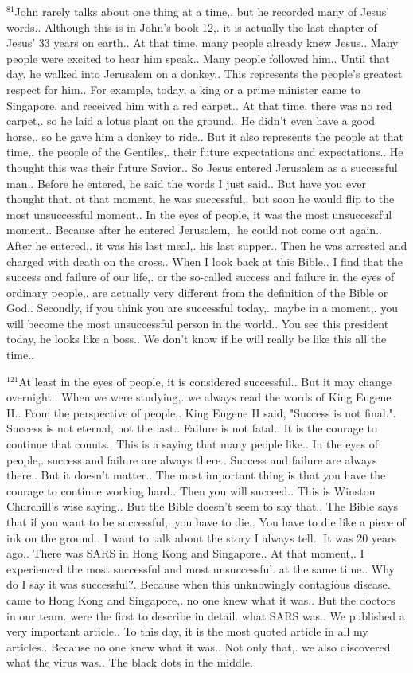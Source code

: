 \documentclass{book}
\begin{document}
$^{81}$John rarely talks about one thing at a time,.
but he recorded many of Jesus' words..
Although this is in John's book 12,.
it is actually the last chapter of Jesus' 33 years on earth..
At that time, many people already knew Jesus..
Many people were excited to hear him speak..
Many people followed him..
Until that day, he walked into Jerusalem on a donkey..
This represents the people's greatest respect for him..
For example, today, a king or a prime minister came to Singapore.
and received him with a red carpet..
At that time, there was no red carpet,.
so he laid a lotus plant on the ground..
He didn't even have a good horse,.
so he gave him a donkey to ride..
But it also represents the people at that time,.
the people of the Gentiles,.
their future expectations and expectations..
He thought this was their future Savior..
So Jesus entered Jerusalem as a successful man..
Before he entered, he said the words I just said..
But have you ever thought that.
at that moment, he was successful,.
but soon he would flip to the most unsuccessful moment..
In the eyes of people, it was the most unsuccessful moment..
Because after he entered Jerusalem,.
he could not come out again..
After he entered,.
it was his last meal,.
his last supper..
Then he was arrested and charged with death on the cross..
When I look back at this Bible,.
I find that the success and failure of our life,.
or the so-called success and failure in the eyes of ordinary people,.
are actually very different from the definition of the Bible or God..
Secondly, if you think you are successful today,.
maybe in a moment,.
you will become the most unsuccessful person in the world..
You see this president today, he looks like a boss..
We don't know if he will really be like this all the time..

$^{121}$At least in the eyes of people, it is considered successful..
But it may change overnight..
When we were studying,.
we always read the words of King Eugene II..
From the perspective of people,.
King Eugene II said, "Success is not final.".
Success is not eternal, not the last..
Failure is not fatal..
It is the courage to continue that counts..
This is a saying that many people like..
In the eyes of people,.
success and failure are always there..
Success and failure are always there..
But it doesn't matter..
The most important thing is that you have the courage to continue working hard..
Then you will succeed..
This is Winston Churchill's wise saying..
But the Bible doesn't seem to say that..
The Bible says that if you want to be successful,.
you have to die..
You have to die like a piece of ink on the ground..
I want to talk about the story I always tell..
It was 20 years ago..
There was SARS in Hong Kong and Singapore..
At that moment,.
I experienced the most successful and most unsuccessful.
at the same time..
Why do I say it was successful?.
Because when this unknowingly contagious disease.
came to Hong Kong and Singapore,.
no one knew what it was..
But the doctors in our team.
were the first to describe in detail.
what SARS was..
We published a very important article..
To this day, it is the most quoted article in all my articles..
Because no one knew what it was..
Not only that,.
we also discovered what the virus was..
The black dots in the middle.
\end{document}
